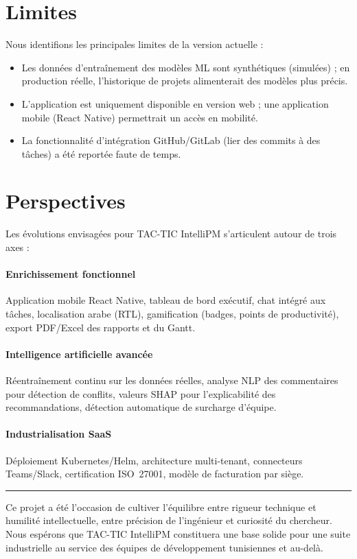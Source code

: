 \section*{Limites}

Nous identifions les principales limites de la version actuelle :

\begin{itemize}
  \item Les données d'entraînement des modèles ML sont synthétiques (simulées) ;
        en production réelle, l'historique de projets alimenterait des modèles
        plus précis.
  \item L'application est uniquement disponible en version web ; une application
        mobile (React Native) permettrait un accès en mobilité.
  \item La fonctionnalité d'intégration GitHub/GitLab (lier des commits à des tâches)
        a été reportée faute de temps.
\end{itemize}

\section*{Perspectives}

Les évolutions envisagées pour TAC-TIC IntelliPM s'articulent autour de trois axes :

\paragraph{Enrichissement fonctionnel}
Application mobile React Native, tableau de bord exécutif, chat intégré aux tâches,
localisation arabe (RTL), gamification (badges, points de productivité), export
PDF/Excel des rapports et du Gantt.

\paragraph{Intelligence artificielle avancée}
Réentraînement continu sur les données réelles, analyse NLP des commentaires pour
détection de conflits, valeurs SHAP pour l'explicabilité des recommandations,
détection automatique de surcharge d'équipe.

\paragraph{Industrialisation SaaS}
Déploiement Kubernetes/Helm, architecture multi-tenant, connecteurs Teams/Slack,
certification ISO~27001, modèle de facturation par siège.

\bigskip
\noindent\rule{\linewidth}{0.5pt}

\medskip
Ce projet a été l'occasion de cultiver l'équilibre entre rigueur technique
et humilité intellectuelle, entre précision de l'ingénieur et curiosité du
chercheur. Nous espérons que TAC-TIC IntelliPM constituera une base solide
pour une suite industrielle au service des équipes de développement tunisiennes
et au-delà.
